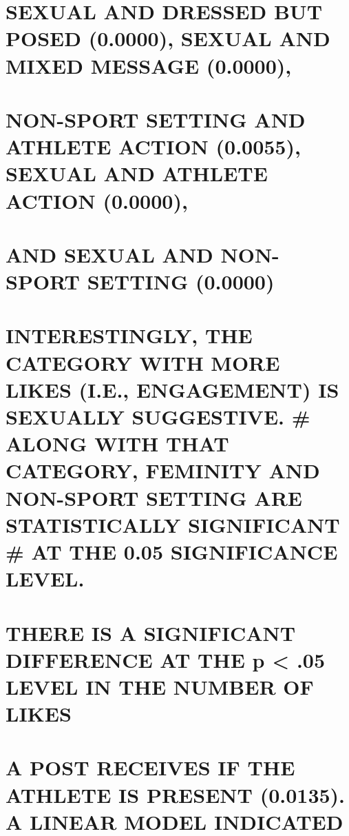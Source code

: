 \documentclass[
]{article}
\begin{document}
\hypertarget{sexual-and-dressed-but-posed-0.0000-sexual-and-mixed-message-0.0000}{%
\section{SEXUAL AND DRESSED BUT POSED (0.0000), SEXUAL AND MIXED MESSAGE
(0.0000),}\label{sexual-and-dressed-but-posed-0.0000-sexual-and-mixed-message-0.0000}}

\hypertarget{non-sport-setting-and-athlete-action-0.0055-sexual-and-athlete-action-0.0000}{%
\section{NON-SPORT SETTING AND ATHLETE ACTION (0.0055), SEXUAL AND
ATHLETE ACTION
(0.0000),}\label{non-sport-setting-and-athlete-action-0.0055-sexual-and-athlete-action-0.0000}}

\hypertarget{and-sexual-and-non-sport-setting-0.0000}{%
\section{AND SEXUAL AND NON-SPORT SETTING
(0.0000)}\label{and-sexual-and-non-sport-setting-0.0000}}

\hypertarget{interestingly-the-category-with-more-likes-i.e.-engagement-is-sexually-suggestive.-along-with-that-category-feminity-and-non-sport-setting-are-statistically-significant-at-the-0.05-significance-level.}{%
\section{INTERESTINGLY, THE CATEGORY WITH MORE LIKES (I.E., ENGAGEMENT)
IS SEXUALLY SUGGESTIVE. \# ALONG WITH THAT CATEGORY, FEMINITY AND
NON-SPORT SETTING ARE STATISTICALLY SIGNIFICANT \# AT THE 0.05
SIGNIFICANCE
LEVEL.}\label{interestingly-the-category-with-more-likes-i.e.-engagement-is-sexually-suggestive.-along-with-that-category-feminity-and-non-sport-setting-are-statistically-significant-at-the-0.05-significance-level.}}

\hypertarget{there-is-a-significant-difference-at-the-p-.05-level-in-the-number-of-likes}{%
\section{THERE IS A SIGNIFICANT DIFFERENCE AT THE p \textless{} .05
LEVEL IN THE NUMBER OF
LIKES}\label{there-is-a-significant-difference-at-the-p-.05-level-in-the-number-of-likes}}

\hypertarget{a-post-receives-if-the-athlete-is-present-0.0135.-a-linear-model-indicated}{%
\section{A POST RECEIVES IF THE ATHLETE IS PRESENT (0.0135). A LINEAR
MODEL
INDICATED}\label{a-post-receives-if-the-athlete-is-present-0.0135.-a-linear-model-indicated}}
\end{document}
